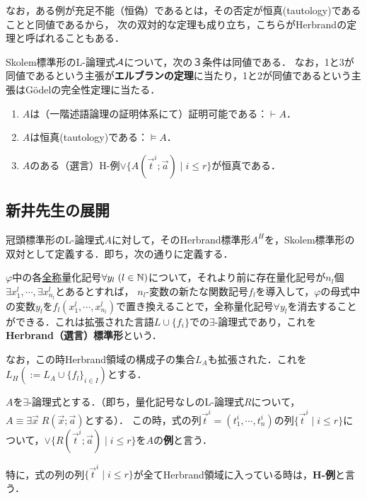 \documentclass[uplatex, 12pt, dvipdfmx]{jsreport}
\begin{document}
なお，ある例が充足不能（恒偽）であるとは，その否定が恒真(tautology)であることと同値であるから，
次の双対的な定理も成り立ち，こちらがHerbrandの定理と呼ばれることもある．

\begin{theorem}
    Skolem標準形のL-論理式$\mathcal{A}$について，次の３条件は同値である．
    なお，1と3が同値であるという主張が\textbf{エルブランの定理}に当たり，1と2が同値であるという主張はGödelの完全性定理に当たる．
    \begin{enumerate}
        \item $A$は（一階述語論理の証明体系にて）証明可能である：$\vdash A$．
        \item $A$は恒真(tautology)である：$\vDash A$．
        \item $A$のある（選言）H-例$\lor\{A(\vec{t}^i;\vec{a})\mid i\le r\}$が恒真である．
    \end{enumerate}
\end{theorem}

\subsection{新井先生の展開}

\begin{definition}
    冠頭標準形のL-論理式$A$に対して，そのHerbrand標準形$A^H$を，Skolem標準形の双対として定義する．即ち，次の通りに定義する．
    
    $\varphi$中の各\underline{全称}量化記号$\forall y_l\;(l\in\mathbb{N})$について，それより前に存在量化記号が$n_l$個$\exists x_1^l,\cdots,\exists x_{n_l}^l$とあるとすれば，
    $n_l$-変数の新たな関数記号$f_l$を導入して，$\varphi$の母式中の変数$y_l$を$f_l(x^l_1,\cdots,x^l_{n_l})$で置き換えることで，全称量化記号$\forall y_l$を消去することができる．これは拡張された言語$L\cup\{f_i\}$での$\exists$-論理式であり，これを\textbf{Herbrand（選言）標準形}という．

    なお，この時Herbrand領域の構成子の集合$L_A$も拡張された．これを$L_H(:=L_A\cup\{f_l\}_{i\in I})$とする．
\end{definition}

\begin{definition}
    $A$を$\exists$-論理式とする．（即ち，量化記号なしのL-論理式$R$について，$A\equiv\exists\vec{x}\;R(\vec{x};\vec{a})$とする）．
    この時，式の列$\vec{t}^i=(t^i_1,\cdots,t^i_n)$の列$\{\vec{t}^i\mid i\le r\}$について，$\lor\{R(\vec{t}^i;\vec{a})\mid i\le r\}$を$A$の\textbf{例}と言う．

    特に，式の列の列$\{\vec{t}^i\mid i\le r\}$が全てHerbrand領域に入っている時は，\textbf{H-例}と言う．
\end{definition}
\end{document}
